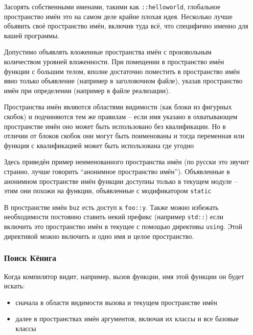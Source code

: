 \documentclass[a4paper,12pt,oneside]{article}
\begin{document}
Засорять собственными именами, такими как \lstinline!::helloworld!, глобальное пространство имён это на самом деле крайне плохая идея. Несколько лучше объявить своё пространство имён, включив туда всё, что специфично именно для вашей программы.



Допустимо объявлять вложенные пространства имён с произвольным количеством уровней вложенности. При помещении в пространство имён функции с большим телом, вполне достаточно поместить в пространство имён явно только объявление (например в заголовочном файле), указав пространство имён при определении (например в файле реализации).



Пространства имён являются областями видимости (как блоки из фигурных скобок) и подчиняются тем же правилам – если имя указано в охватывающем пространстве имён оно может быть использовано без квалификации. Но в отличии от блоков скобок они могут быть поименованы и тогда переменная или функция с квалификацией может быть использована где угодно



Здесь приведён пример неименованного пространства имён (по русски это звучит странно, лучше говорить ``анонимное пространство имён''). Объявленные в анонимном пространстве имён функции доступны только в текущем модуле -- этим они похожи на функции, объявленные с модификатором \lstinline!static!

В пространстве имён \lstinline!buz! есть доступ к \lstinline!foo::y!. Также можно избежать необходимости постоянно ставить некий префикс (например \lstinline!std::!) если включить это пространство имён в текущее с помощью директивы \lstinline!using!. Этой директивой можно включить и одно имя и целое пространство.

\subsubsection{Поиск Кёнига}

Когда компилятор видит, например, вызов функции, имя этой функции он будет искать:
\begin{itemize}
\item
сначала в области видимости вызова и текущем пространстве имён
\item
далее в пространствах имён аргументов, включая их классы и все базовые классы
\end{itemize}
\end{document}
